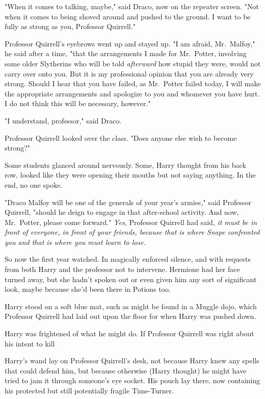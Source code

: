 "When it comes to talking, maybe," said Draco, now on the repeater screen. "Not
when it comes to being shoved around and pushed to the ground. I want to be
fully as strong as you, Professor Quirrell."

Professor Quirrell's eyebrows went up and stayed up. "I am afraid, Mr.~Malfoy,"
he said after a time, "that the arrangements I made for Mr.~Potter, involving
some older Slytherins who will be told \emph{afterward} how stupid they were,
would not carry over onto you. But it is my professional opinion that you are
already very strong. Should I hear that you have failed, as Mr.~Potter failed
today, I will make the appropriate arrangements and apologize to you and
whomever you have hurt. I do not think this will be necessary, however."

"I understand, professor," said Draco.

Professor Quirrell looked over the class. "Does anyone else wish to become
strong?"

Some students glanced around nervously. Some, Harry thought from his back row,
looked like they were opening their mouths but not saying anything. In the end,
no one spoke.

"Draco Malfoy will be one of the generals of your year's armies," said
Professor Quirrell, "should he deign to engage in that after-school activity.
And now, Mr.~Potter, please come forward."
\sbreak
\emph{Yes,} Professor Quirrell had said, \emph{it must be in front of everyone,
in front of your friends, because that is where Snape confronted you and that
is where you must learn to lose.}

So now the first year watched. In magically enforced silence, and with requests
from both Harry and the professor not to intervene. Hermione had her face
turned away, but she hadn't spoken out or even given him any sort of
significant look, maybe because she'd been there in Potions too.

Harry stood on a soft blue mat, such as might be found in a Muggle dojo, which
Professor Quirrell had laid out upon the floor for when Harry was pushed down.

Harry was frightened of what he might do. If Professor Quirrell was right about
his intent to kill{\el}

Harry's wand lay on Professor Quirrell's desk, not because Harry knew any
spells that could defend him, but because otherwise (Harry thought) he might
have tried to jam it through someone's eye socket. His pouch lay there, now
containing his protected but still potentially fragile Time-Turner.

